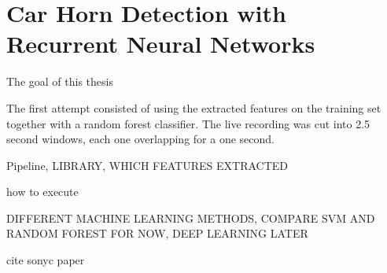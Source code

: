 \chapter{Car Horn Detection with Recurrent Neural Networks}
\label{Detection}

The goal of this thesis 


The first attempt consisted of using the extracted features on the training set together with a random forest classifier.
The live recording was cut into 2.5 second windows, each one overlapping for a one second. 

Pipeline, LIBRARY, WHICH FEATURES EXTRACTED


how to execute


DIFFERENT MACHINE LEARNING METHODS, COMPARE SVM AND RANDOM FOREST FOR NOW, DEEP LEARNING LATER

cite sonyc paper